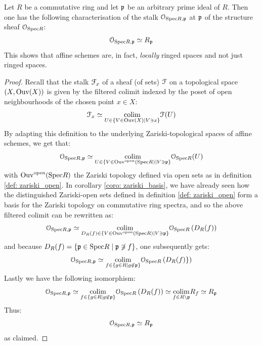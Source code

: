                 \begin{corollary} \label{coro: structure_sheaf_properties}
                    Let $R$ be a commutative ring and let $\mathfrak{p}$ be an arbitrary prime ideal of $R$. Then one has the following characterisation of the stalk $\mathcal{O}_{\mathrm{Spec} R, \mathfrak{p}}$ at $\mathfrak{p}$ of the structure sheaf $\mathcal{O}_{\mathrm{Spec} R}$:
                        $$\mathcal{O}_{\mathrm{Spec} R, \mathfrak{p}} \simeq R_{\mathfrak{p}}$$
                    This shows that affine schemes are, in fact, \textit{locally} ringed spaces and not just ringed spaces. 
                \end{corollary} 
                    \begin{proof}
                        Recall that the stalk $\mathcal{F}_x$ of a sheaf (of sets) $\mathcal{F}$ on a topological space $(X, \mathrm{Ouv}(X))$ is given by the filtered colimit indexed by the poset of open neighbourhoods of the chosen point $x \in X$:
                            $$\mathcal{F}_x \simeq \underset{U \in \{V \in \mathrm{Ouv}(X) \mid V \ni x\}}{\operatorname{colim}} \mathcal{F}(U)$$
                        By adapting this definition to the underlying Zariski-topological spaces of affine schemes, we get that:
                            $$\mathcal{O}_{\mathrm{Spec} R, \mathfrak{p}} \simeq \underset{U \in \{V \in \mathrm{Ouv}^{\mathrm{open}}(\mathrm{Spec} R) \mid V \ni \mathfrak{p}\}}{\operatorname{colim}} \mathcal{O}_{\mathrm{Spec} R}(U)$$
                        with $\mathrm{Ouv}^{\mathrm{open}}(\mathrm{Spec} R)$ the Zariski topology defined via open sets as in definition \ref{def: zariski_open}. In corollary \ref{coro: zariski_basis}, we have already seen how the distinguished Zariski-open sets defined in definition \ref{def: zariski_open} form a basis for the Zariski topology on commutative ring spectra, and so the above filtered colimit can be rewritten as:
                            $$\mathcal{O}_{\mathrm{Spec} R, \mathfrak{p}} \simeq \underset{D_R(f) \in \{V \in \mathrm{Ouv}^{\mathrm{open}}(\mathrm{Spec} R) \mid V \ni \mathfrak{p}\}}{\operatorname{colim}} \mathcal{O}_{\mathrm{Spec} R}\left(D_R(f)\right)$$
                        and because $D_R(f) = \{\mathfrak{p} \in \mathrm{Spec} R \mid \mathfrak{p} \not \ni f\}$, one subsequently gets:
                            $$\mathcal{O}_{\mathrm{Spec} R, \mathfrak{p}} \simeq \underset{f \in \{g \in R \mid g \not \in \mathfrak{p}\}}{\operatorname{colim}} \mathcal{O}_{\mathrm{Spec} R}\left(D_R(f)\}\right)$$
                        Lastly we have the following isomorphism:
                            $$\mathcal{O}_{\mathrm{Spec} R, \mathfrak{p}} \simeq \underset{f \in \{g \in R \mid g \not \in \mathfrak{p}\}}{\operatorname{colim}} \mathcal{O}_{\mathrm{Spec} R}\left(D_R(f)\right) \simeq \underset{f \in R \setminus \mathfrak{p}}{\operatorname{colim}} R_f \simeq R_{\mathfrak{p}}$$
                        Thus:
                            $$\mathcal{O}_{\mathrm{Spec} R, \mathfrak{p}} \simeq R_{\mathfrak{p}}$$
                        as claimed.
                    \end{proof}
                    
